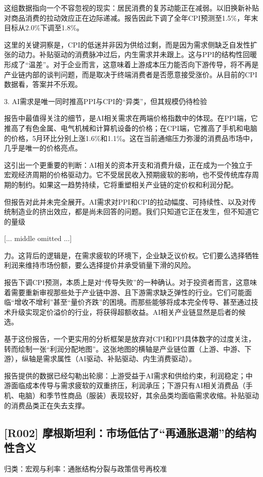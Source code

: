 \documentclass[11pt]{ctexart}
\begin{document}
这组数据指向一个不容忽视的现实：居民消费的复苏动能正在减弱。以旧换新补贴对商品消费的拉动效应正在边际递减。报告因此下调了全年CPI预测至1.5\%，年末目标从2.0\%下调至1.8\%。

这里的关键洞察是，CPI的低迷并非因为供给过剩，而是因为需求侧缺乏自发性扩张的动力。补贴驱动的消费脉冲过后，内生需求并未跟上。这与PPI的结构性回暖形成了“温差”。对于企业而言，这意味着上游成本压力能否向下游传导，将不再是产业链内部的谈判问题，而是取决于终端消费者是否愿意接受涨价。从目前的CPI数据看，答案并不乐观。

3. AI需求是唯一同时推高PPI与CPI的“异类”，但其规模仍待检验

报告中最值得关注的细节，是AI相关需求在两端价格指数中的体现。在PPI端，它推高了有色金属、电气机械和计算机设备的价格；在CPI端，它推高了手机和电脑的价格，5月环比分别上涨1.6\%和1.1\%。这在当前通缩压力弥漫的消费品市场中，几乎是唯一的价格亮点。

这引出一个更重要的判断：AI相关的资本开支和消费升级，正在成为一个独立于宏观经济周期的价格驱动力。它不受居民收入预期疲软的影响，也不受传统库存周期的制约。如果这一趋势持续，它将重塑相关产业链的定价权和利润分配。

但报告对此并未完全展开。AI需求对PPI和CPI的拉动幅度、可持续性、以及对传统制造业的挤出效应，都是尚未回答的问题。我们只知道它正在发生，但不知道它的量级

[... middle omitted ...]

力。这背后的逻辑是，在需求疲软的环境下，企业缺乏议价权。它们要么选择牺牲利润来维持市场份额，要么选择提价并承受销量下滑的风险。

报告下调CPI预测，本质上是对“传导失败”的一种确认。对于投资者而言，这意味着需要重新审视那些处于产业链中游、且下游需求缺乏弹性的行业。它们可能面临“增收不增利”甚至“量价齐跌”的困境。而那些能够将成本完全传导、甚至通过技术升级实现定价溢价的行业，将获得超额收益。AI相关产业链显然是后者的候选。

基于这份报告，一个更实用的分析框架是放弃对CPI和PPI具体数字的过度关注，转而绘制一张“利润分配地图”。这张地图的横轴是产业链位置（上游、中游、下游），纵轴是需求属性（AI驱动、补贴驱动、内生消费驱动）。

报告提供的数据已经勾勒出轮廓：上游受益于AI需求和供给约束，利润稳定；中游面临成本传导与需求疲软的双重挤压，利润承压；下游只有AI相关消费品（手机、电脑）和季节性商品（服装）表现较好，其余品类均面临需求收缩。补贴驱动的消费品类正在失去支撑。

\subsection{[R002] 摩根斯坦利：市场低估了“再通胀退潮”的结构性含义}
{\small\color{refgray}归类：宏观与利率：通胀结构分裂与政策信号再校准}
\end{document}
